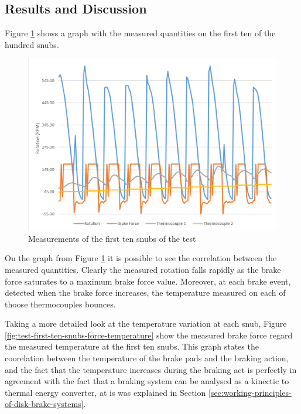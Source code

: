 	\subsection{Results and Discussion}

		Figure \ref{fig:test-first-ten-snubs} shows a graph with the measured quantities on the first ten of the hundred snubs.

		\begin{figure}[htbp]
				\centering
				\includegraphics[width=.8\textwidth]{figuras/fig-test-first-ten-snubs}
				\caption{Measurements of the first ten snubs of the test}
				\label{fig:test-first-ten-snubs}
		\end{figure}

		On the graph from Figure \ref{fig:test-first-ten-snubs} it is possible to see the correlation between the measured quantities. Clearly the measured rotation falls rapidly as the brake force saturates to a maximum brake force value. Moreover, at each brake event, detected when the brake force increases, the temperature measured on each of thoose thermocouples bounces.
		\par

		Taking a more detailed look at the temperature variation at each snub, Figure \ref{fig:test-first-ten-snubs-force-temperature} show the measured brake force regard the measured temperature at the first ten snubs. This graph states the coorelation between the temperature of the brake pads and the braking action, and the fact that the temperature increases during the braking act is perfectly in agreement with the fact that a braking system can be analysed as a kinectic to thermal energy converter, at is was explained in Section \ref{sec:working-principles-of-disk-brake-systems}.

